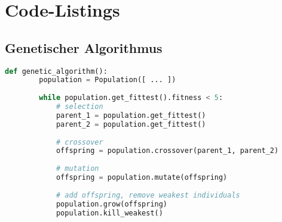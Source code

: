 \chapter{Code-Listings}

\section{Genetischer Algorithmus}

\begin{lstlisting}[language=Python, caption=Genetischer Algorithmus (Python)]
    def genetic_algorithm():
        population = Population([ ... ])
    
        while population.get_fittest().fitness < 5:
            # selection
            parent_1 = population.get_fittest()
            parent_2 = population.get_fittest()
    
            # crossover
            offspring = population.crossover(parent_1, parent_2)
    
            # mutation
            offspring = population.mutate(offspring)
    
            # add offspring, remove weakest individuals
            population.grow(offspring)
            population.kill_weakest()
            
    
\end{lstlisting}

\clearpage
\newpage
